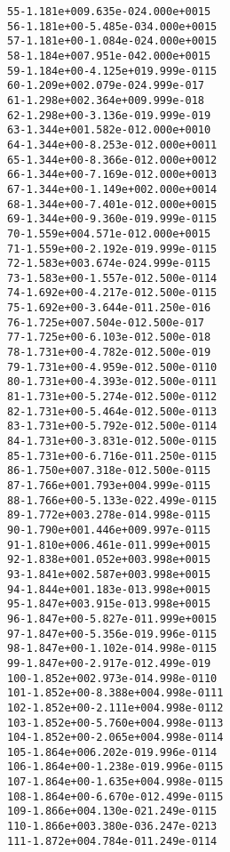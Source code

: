\begin{alltt}
  55  -1.181e+00   9.635e-02   4.000e+00   15
  56  -1.181e+00  -5.485e-03   4.000e+00   15
  57  -1.181e+00  -1.084e-02   4.000e+00   15
  58  -1.184e+00   7.951e-04   2.000e+00   15
  59  -1.184e+00  -4.125e+01   9.999e-01   15
  60  -1.209e+00   2.079e-02   4.999e-01    7
  61  -1.298e+00   2.364e+00   9.999e-01    8
  62  -1.298e+00  -3.136e-01   9.999e-01    9
  63  -1.344e+00   1.582e-01   2.000e+00   10
  64  -1.344e+00  -8.253e-01   2.000e+00   11
  65  -1.344e+00  -8.366e-01   2.000e+00   12
  66  -1.344e+00  -7.169e-01   2.000e+00   13
  67  -1.344e+00  -1.149e+00   2.000e+00   14
  68  -1.344e+00  -7.401e-01   2.000e+00   15
  69  -1.344e+00  -9.360e-01   9.999e-01   15
  70  -1.559e+00   4.571e-01   2.000e+00   15
  71  -1.559e+00  -2.192e-01   9.999e-01   15
  72  -1.583e+00   3.674e-02   4.999e-01   15
  73  -1.583e+00  -1.557e-01   2.500e-01   14
  74  -1.692e+00  -4.217e-01   2.500e-01   15
  75  -1.692e+00  -3.644e-01   1.250e-01    6
  76  -1.725e+00   7.504e-01   2.500e-01    7
  77  -1.725e+00  -6.103e-01   2.500e-01    8
  78  -1.731e+00  -4.782e-01   2.500e-01    9
  79  -1.731e+00  -4.959e-01   2.500e-01   10
  80  -1.731e+00  -4.393e-01   2.500e-01   11
  81  -1.731e+00  -5.274e-01   2.500e-01   12
  82  -1.731e+00  -5.464e-01   2.500e-01   13
  83  -1.731e+00  -5.792e-01   2.500e-01   14
  84  -1.731e+00  -3.831e-01   2.500e-01   15
  85  -1.731e+00  -6.716e-01   1.250e-01   15
  86  -1.750e+00   7.318e-01   2.500e-01   15
  87  -1.766e+00   1.793e+00   4.999e-01   15
  88  -1.766e+00  -5.133e-02   2.499e-01   15
  89  -1.772e+00   3.278e-01   4.998e-01   15
  90  -1.790e+00   1.446e+00   9.997e-01   15
  91  -1.810e+00   6.461e-01   1.999e+00   15
  92  -1.838e+00   1.052e+00   3.998e+00   15
  93  -1.841e+00   2.587e+00   3.998e+00   15
  94  -1.844e+00   1.183e-01   3.998e+00   15
  95  -1.847e+00   3.915e-01   3.998e+00   15
  96  -1.847e+00  -5.827e-01   1.999e+00   15
  97  -1.847e+00  -5.356e-01   9.996e-01   15
  98  -1.847e+00  -1.102e-01   4.998e-01   15
  99  -1.847e+00  -2.917e-01   2.499e-01    9
 100  -1.852e+00   2.973e-01   4.998e-01   10
 101  -1.852e+00  -8.388e+00   4.998e-01   11
 102  -1.852e+00  -2.111e+00   4.998e-01   12
 103  -1.852e+00  -5.760e+00   4.998e-01   13
 104  -1.852e+00  -2.065e+00   4.998e-01   14
 105  -1.864e+00   6.202e-01   9.996e-01   14
 106  -1.864e+00  -1.238e-01   9.996e-01   15
 107  -1.864e+00  -1.635e+00   4.998e-01   15
 108  -1.864e+00  -6.670e-01   2.499e-01   15
 109  -1.866e+00   4.130e-02   1.249e-01   15
 110  -1.866e+00   3.380e-03   6.247e-02   13
 111  -1.872e+00   4.784e-01   1.249e-01   14

\end{alltt}
